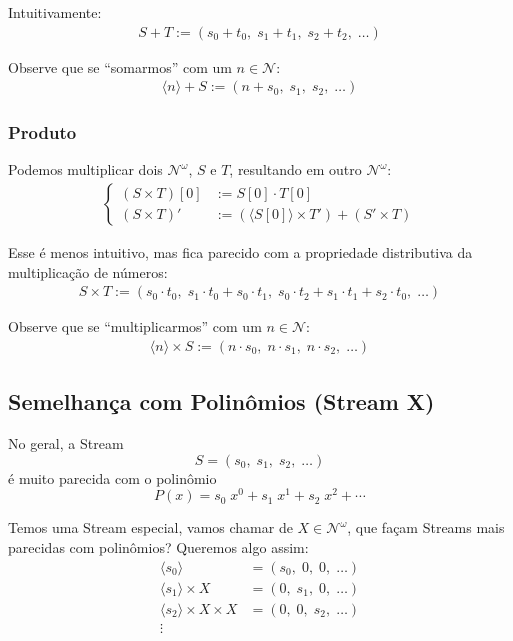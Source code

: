 \documentclass{article}
\newcommand{\Num}{\mathcal{N}}
\newcommand{\ins}[1]{\langle #1 \rangle}
\begin{document}
Intuitivamente:
\begin{align*}
    S + T := (s_0 + t_0, \; s_1 + t_1, \; s_2 + t_2, \; \dots)
\end{align*}

Observe que se ``somarmos'' com um \(n \in \Num\):
\begin{align*}
    \ins{n} + S := (n + s_0, \; s_1, \; s_2, \; \dots)
\end{align*}

\subsubsection{Produto}

Podemos multiplicar dois \(\Num^\omega\),
\(S\) e \(T\),
resultando em outro \(\Num^\omega\):
\begin{align*} \begin{cases}
    (S \times T)[0] &:= S[0] \cdot T[0] \\
    (S \times T)'   &:= (\ins{S[0]} \times T') + (S' \times T)
\end{cases} \end{align*}

Esse é menos intuitivo,
mas fica parecido com
a propriedade distributiva da multiplicação de números:
\begin{align*}
    S \times T :=
    (s_0 \cdot t_0,
    \; s_1 \cdot t_0 + s_0 \cdot t_1,
    \; s_0 \cdot t_2 + s_1 \cdot t_1 + s_2 \cdot t_0,
    \; \dots)
\end{align*}

Observe que se ``multiplicarmos'' com um \(n \in \Num\):
\begin{align*}
    \ins{n} \times S := (n \cdot s_0, \; n \cdot s_1, \; n \cdot s_2, \; \dots)
\end{align*}

\subsection{Semelhança com Polinômios (Stream X)}

No geral, a Stream
\[
    S = (s_0, \; s_1, \; s_2, \; \dots)
\]
é muito parecida com o polinômio
\[
    P(x) = s_0 \; x^0 + s_1 \; x^1 + s_2 \; x^2 + \cdots
\]

Temos uma Stream especial,
vamos chamar de \(X \in \Num^\omega\),
que façam Streams mais parecidas com polinômios?
Queremos algo assim:
\begin{align*}
    \ins{s_0} &= (s_0, \; 0, \; 0, \; \dots) \\
    \ins{s_1} \times X &= (0, \; s_1, \; 0, \; \dots) \\
    \ins{s_2} \times X \times X &= (0, \; 0, \; s_2, \; \dots) \\
    \vdots&
\end{align*}
\end{document}
